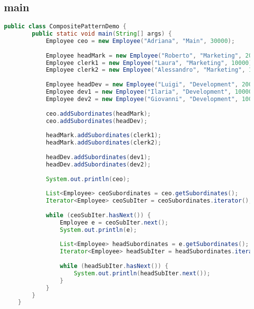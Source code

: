 \subsection{main}
\begin{lstlisting}[language=java]
    public class CompositePatternDemo {
        public static void main(String[] args) {
            Employee ceo = new Employee("Adriana", "Main", 30000);
    
            Employee headMark = new Employee("Roberto", "Marketing", 20000);
            Employee clerk1 = new Employee("Laura", "Marketing", 10000);
            Employee clerk2 = new Employee("Alessandro", "Marketing", 10000);
    
            Employee headDev = new Employee("Luigi", "Development", 20000);
            Employee dev1 = new Employee("Ilaria", "Development", 10000);
            Employee dev2 = new Employee("Giovanni", "Development", 10000);
    
            ceo.addSubordinates(headMark);
            ceo.addSubordinates(headDev);
    
            headMark.addSubordinates(clerk1);
            headMark.addSubordinates(clerk2);
    
            headDev.addSubordinates(dev1);
            headDev.addSubordinates(dev2);
    
            System.out.println(ceo);
    
            List<Employee> ceoSubordinates = ceo.getSubordinates();
            Iterator<Employee> ceoSubIter = ceoSubordinates.iterator();
    
            while (ceoSubIter.hasNext()) {
                Employee e = ceoSubIter.next();
                System.out.println(e);
    
                List<Employee> headSubordinates = e.getSubordinates();
                Iterator<Employee> headSubIter = headSubordinates.iterator();
                
                while (headSubIter.hasNext()) {
                    System.out.println(headSubIter.next());
                }
            }
        }
    }
\end{lstlisting}